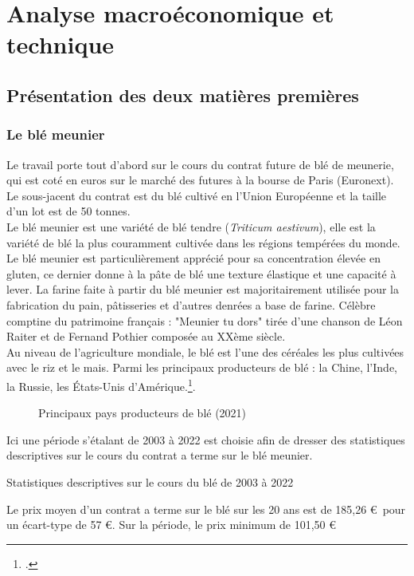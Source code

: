 \section{Analyse macroéconomique et technique}
\subsection{Présentation des deux matières premières}
\subsubsection{Le blé meunier}
Le travail porte tout d'abord sur le cours du contrat future de blé de meunerie, qui est coté en euros sur le marché des futures à la bourse de Paris (Euronext). 
Le sous-jacent du contrat est du blé cultivé en l'Union Européenne et la taille d'un lot est de 50 tonnes. \\[11pt]
Le blé meunier est une variété de blé tendre (\textit{Triticum aestivum}), elle est la variété de blé la plus couramment cultivée dans les régions tempérées 
du monde. Le blé meunier est particulièrement apprécié pour sa concentration élevée en gluten, ce dernier donne à la pâte de blé une texture élastique et une capacité à 
lever. La farine faite à partir du blé meunier est majoritairement utilisée pour la fabrication du pain, pâtisseries et d'autres denrées a base de farine. Célèbre comptine 
du patrimoine français : "Meunier tu dors" tirée d'une chanson de Léon Raiter et de Fernand Pothier composée au XXème siècle.\\[11pt]
Au niveau de l'agriculture mondiale, le blé est l'une des céréales les plus cultivées avec le riz et le mais. Parmi les principaux
producteurs de blé : la Chine, l'Inde, la Russie, les États-Unis d'Amérique.\footcite{fao_2021}.
\begin{figure}[H]
    \centering
    \label{fig:ble_prod}
    \resizebox{0.8\textwidth}{!}{}
    \caption{Principaux pays producteurs de blé (2021)}
\end{figure}
Ici une période s'étalant de 2003 à 2022 est choisie afin de dresser des statistiques descriptives sur le cours du contrat a terme sur le blé meunier. 
\begin{table}[H]
    \centering
    \caption{Statistiques descriptives sur le cours du blé de 2003 à 2022}
    \sffamily
    
\end{table}
Le prix moyen d'un contrat a terme sur le blé sur les 20 ans est de 185,26 \euro\ pour un écart-type de 57 \euro. Sur la période, le prix minimum de 101,50 \euro\ 
